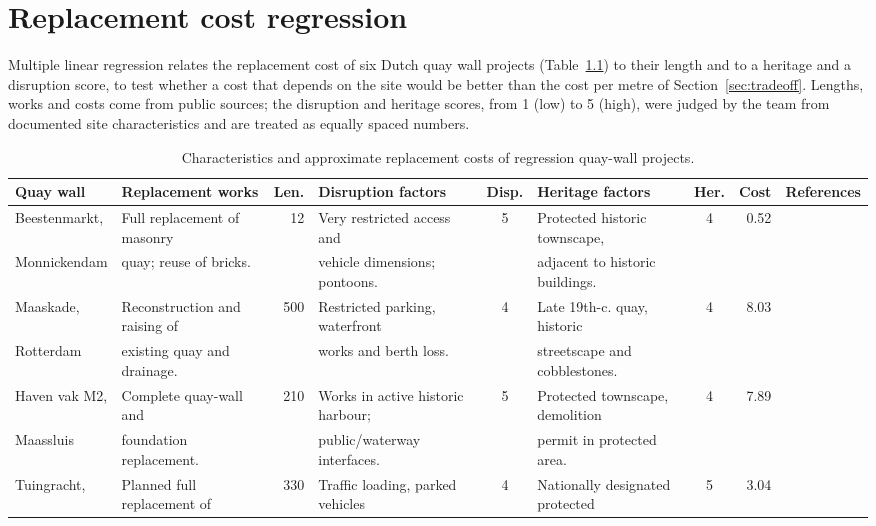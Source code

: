 \chapter{Replacement cost regression}
\label{app:cost}

Multiple linear regression relates the replacement cost of six Dutch quay wall
projects (Table~\ref{tab:dutch-quay-walls}) to their length and to a heritage
and a disruption score, to test whether a cost that depends on the site would
be better than the cost per metre of Section~\ref{sec:tradeoff}. Lengths, works
and costs come from public sources; the disruption and heritage scores, from 1
(low) to 5 (high), were judged by the team from documented site
characteristics and are treated as equally spaced numbers.

\begin{table}[htbp]
\centering
\tiny
\caption{Characteristics and approximate replacement costs of regression quay-wall projects.}
\label{tab:dutch-quay-walls}
\setlength{\tabcolsep}{3pt}
\renewcommand{\arraystretch}{1.2}
\begin{tabular}{@{} l l r l c l c r l @{}}
\toprule
Quay wall & Replacement works & Len. & Disruption factors & Disp. & Heritage factors & Her. & Cost & References \\
\midrule
Beestenmarkt, & Full replacement of masonry & 12 & Very restricted access and & 5 & Protected historic townscape, & 4 & 0.52 & \cite{waterland2025,} \\
Monnickendam & quay; reuse of bricks. & & vehicle dimensions; pontoons. & & adjacent to historic buildings. & & & \cite{kdekker2025} \\
\addlinespace
Maaskade, & Reconstruction and raising of & 500 & Restricted parking, waterfront & 4 & Late 19th-c. quay, historic & 4 & 8.03 & \cite{maaskadeaward2018,} \\
Rotterdam & existing quay and drainage. & & works and berth loss. & & streetscape and cobblestones.  \\
\addlinespace
Haven vak M2, & Complete quay-wall and & 210 & Works in active historic harbour; & 5 & Protected townscape, demolition & 4 & 7.89 & \cite{maassluis2026,} \\
Maassluis & foundation replacement. & & public/waterway interfaces. & & permit in protected area. & & & \\
\addlinespace
Tuingracht, & Planned full replacement of & 330 & Traffic loading, parked vehicles & 4 & Nationally designated protected & 5 & 3.04 & \cite{alkmaarMIP,} \\

\end{tabular}
\end{table}
